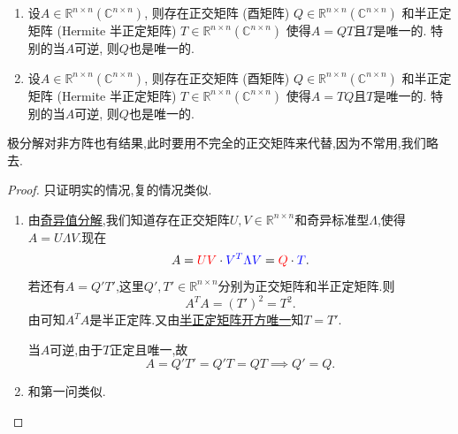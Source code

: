 \documentclass[../../main.tex]{subfiles}%
\begin{document}
\begin{theorem}[极分解]\label{theorem:极分解}
\begin{enumerate}
\item 设\( A \in \mathbb{R}^{n \times n} (\mathbb{C}^{n \times n}) \), 则存在正交矩阵 (酉矩阵) \( Q \in \mathbb{R}^{n \times n} (\mathbb{C}^{n \times n}) \) 和半正定矩阵 (Hermite 半正定矩阵) \( T \in \mathbb{R}^{n \times n} (\mathbb{C}^{n \times n}) \) 使得\( A = QT \)且\( T \)是唯一的. 特别的当\( A \)可逆, 则\( Q \)也是唯一的.

\item 设\( A \in \mathbb{R}^{n \times n} (\mathbb{C}^{n \times n}) \), 则存在正交矩阵 (酉矩阵) \( Q \in \mathbb{R}^{n \times n} (\mathbb{C}^{n \times n}) \) 和半正定矩阵 (Hermite 半正定矩阵) \( T \in \mathbb{R}^{n \times n} (\mathbb{C}^{n \times n}) \) 使得\( A = TQ \)且\( T \)是唯一的. 特别的当\( A \)可逆, 则\( Q \)也是唯一的.
\end{enumerate}
\end{theorem}
\begin{note}
极分解对非方阵也有结果,此时要用不完全的正交矩阵来代替,因为不常用,我们略去.
\end{note}
\begin{proof}

只证明实的情况,复的情况类似.
\begin{enumerate}
\item 由\hyperref[theorem:奇异值分解]{奇异值分解},我们知道存在正交矩阵\( U, V \in \mathbb{R}^{n \times n} \)和奇异标准型\( \Lambda \),使得\( A = U \Lambda V \).现在
\[
A = {\color{red} UV} \cdot {\color{blue} V^T \Lambda V} = {\color{red} Q} \cdot {\color{blue} T}.
\]
若还有\( A = Q'T' \),这里\( Q', T' \in \mathbb{R}^{n \times n} \)分别为正交矩阵和半正定矩阵.则
\[
A^T A = (T')^2 = T^2.
\]
由可知$A^TA$是半正定阵.又由\hyperref[theorem:半正定矩阵开方唯一]{半正定矩阵开方唯一}知\( T = T' \).

当\( A \)可逆,由于\( T \)正定且唯一,故
\[
A = Q'T' =Q'T= QT \implies Q' = Q.
\]

\item 和第一问类似.
\end{enumerate}

\end{proof}
\end{document}
